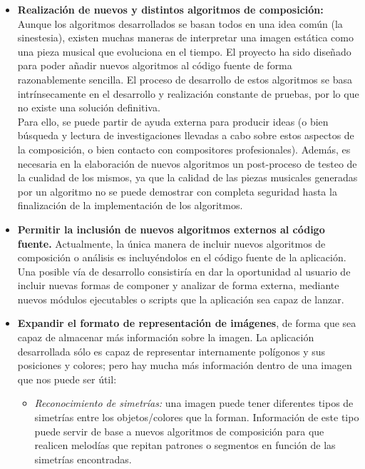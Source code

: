 \begin{itemize}

\item\textbf{Realización de nuevos y distintos algoritmos de composición:} Aunque los algoritmos desarrollados se basan todos en una idea común (la sinestesia), existen muchas maneras de interpretar una imagen estática como una pieza musical que evoluciona en el tiempo. El proyecto ha sido diseñado para poder añadir nuevos algoritmos
al código fuente de forma razonablemente sencilla. El proceso de desarrollo de estos algoritmos se basa intrínsecamente en el desarrollo y realización constante de pruebas, por lo que no existe una solución definitiva.\\

Para ello, se puede partir de ayuda externa para producir ideas (o bien búsqueda y lectura de investigaciones llevadas a cabo sobre estos aspectos de la composición, o bien contacto con compositores profesionales). Además, es necesaria en la elaboración de nuevos algoritmos un post-proceso de testeo de la cualidad de los mismos, ya que la calidad de las piezas musicales generadas por un algoritmo no se puede demostrar con completa seguridad hasta la finalización de la implementación de los algoritmos.

\item\textbf{Permitir la inclusión de nuevos algoritmos externos al código fuente.} Actualmente, la única manera de incluir nuevos algoritmos de composición o análisis es incluyéndolos en el código fuente de la aplicación. Una posible vía de desarrollo consistiría en dar la oportunidad al usuario de incluir nuevas formas de componer y analizar de forma externa, mediante nuevos módulos ejecutables o scripts que la aplicación sea capaz de lanzar.\\

\item\textbf{Expandir el formato de representación de imágenes}, de forma que sea capaz de almacenar más información sobre la imagen. La aplicación desarrollada sólo es capaz de representar internamente polígonos y sus posiciones y colores; pero hay mucha más información dentro de una imagen que nos puede ser útil:

	\begin{itemize}
	
		\item\textit{Reconocimiento de simetrías:} una imagen puede tener diferentes tipos de simetrías entre los objetos/colores que la forman. Información de este tipo puede servir de base a nuevos algoritmos de composición para que realicen melodías que repitan patrones o segmentos en función de las simetrías encontradas.
		

\end{itemize}
\end{itemize}
